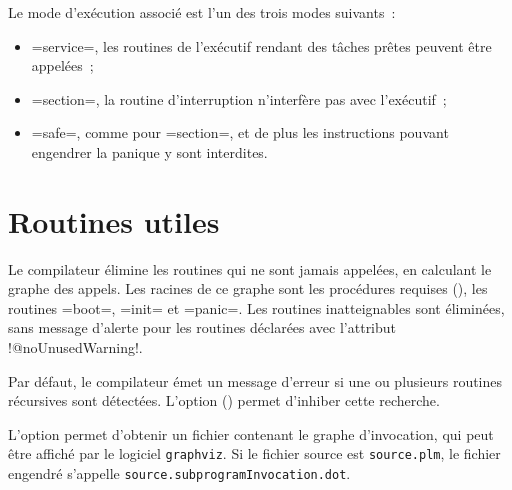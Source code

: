 Le mode d'exécution associé est l'un des trois modes suivants~:
\begin{itemize}
  \item \plm=service=, les routines de l'exécutif rendant des tâches prêtes peuvent être appelées~;
  \item \plm=section=, la routine d'interruption n'interfère pas avec l'exécutif~;
  \item \plm=safe=, comme pour \plm=section=, et de plus les instructions pouvant engendrer la panique y sont interdites.
\end{itemize}









\section{Routines utiles}

Le compilateur élimine les routines qui ne sont jamais appelées, en calculant le graphe des appels. Les racines de ce graphe sont les procédures requises (), les routines \plm=boot=, \plm=init= et \plm=panic=. Les routines inatteignables sont éliminées, sans message d'alerte pour les routines déclarées avec l'attribut \plm!@noUnusedWarning!.












Par défaut, le compilateur émet un message d'erreur si une ou plusieurs routines récursives sont détectées. L'option  () permet d'inhiber cette recherche.

L'option  permet d'obtenir un fichier contenant le graphe d'invocation, qui peut être affiché par le logiciel \texttt{graphviz}. Si le fichier source est \texttt{source.plm}, le fichier engendré s'appelle \texttt{source.subprogramInvocation.dot}.


